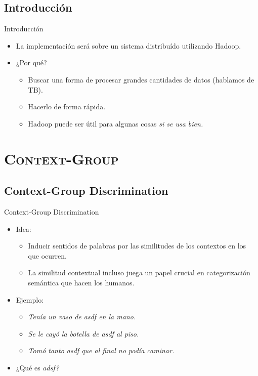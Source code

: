 \documentclass[xcolor=x11names,compress]{beamer}
\renewcommand{\(}{\begin{columns}}
\renewcommand{\)}{\end{columns}}
\newcommand{\<}[1]{\begin{column}{#1}}
\renewcommand{\>}{\end{column}}
\begin{document}
\subsection{Introducción}
\begin{frame}{Introducción}
\begin{itemize}
\item La implementación será sobre un sistema distribuído utilizando Hadoop.
\item ¿Por qué?
\begin{itemize}
\item Buscar una forma de procesar grandes cantidades de datos (hablamos de TB).
\item Hacerlo de forma rápida.
\item Hadoop puede ser útil para algunas cosas \em{si se usa bien}.
\end{itemize}
\end{itemize}
\end{frame}

\section{\scshape Context-Group}
\subsection{Context-Group Discrimination}


\begin{frame}{Context-Group Discrimination}
\begin{itemize}
\item Idea:
\begin{itemize}
\item Inducir sentidos de palabras por las similitudes de los contextos en los que ocurren.
\item La similitud contextual incluso juega un papel crucial en categorización semántica que hacen los humanos.
\end{itemize}
\item Ejemplo:
\begin{itemize}
\item \em Tenía un vaso de asdf en la mano.\em
\item \em Se le cayó la botella de asdf al piso. \em
\item \em Tomó tanto asdf que al final no podía caminar.\em
\end{itemize}
\item ¿Qué es \em adsf\em?
\end{itemize}
\end{frame}
\end{document}
